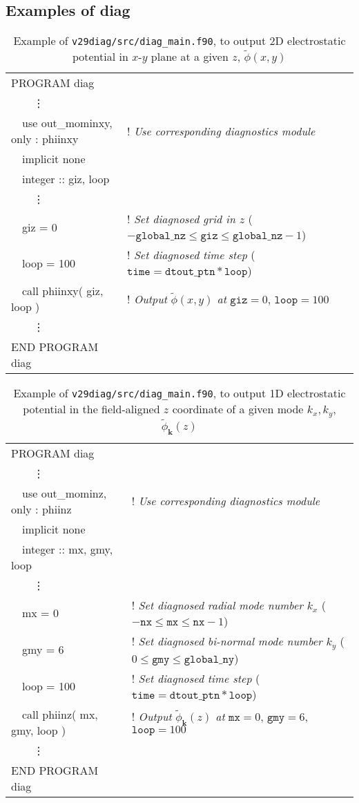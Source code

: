 \subsection{Examples of diag}
\begin{table}[h!]
  \caption{Example of \texttt{v29diag/src/diag\_main.f90}, to output 2D electrostatic potential in $x$-$y$ plane at a given $z$, $\tilde{\phi}(x,y)$}
  \centering
  \begin{tabular}{| l l |}
  \hline
  PROGRAM diag&\\
  ~~~~\vdots&\\
  ~~use out\_mominxy, only : phiinxy  & ! \textit{Use corresponding diagnostics module}\\
  ~~implicit none&\\
  ~~integer :: giz, loop&\\
  ~~~~\vdots&\\
  ~~giz = 0 & ! \textit{Set diagnosed grid in $z$} ($-\texttt{global\_nz} \leq \texttt{giz} \leq \texttt{global\_nz}-1$)\\
  ~~loop = 100 & ! \textit{Set diagnosed time step} ($\texttt{time} = \texttt{dtout\_ptn} * \texttt{loop}$)\\
  ~~call phiinxy( giz, loop ) & ! \textit{Output} $\tilde{\phi}(x,y)$ \textit{at} $\texttt{giz}=0$, $\texttt{loop}=100$\\
  ~~~~\vdots&\\
  END PROGRAM diag&\\
  \hline
  \end{tabular}
\end{table}
\begin{table}[h!]
  \caption{Example of \texttt{v29diag/src/diag\_main.f90}, to output 1D electrostatic potential in the field-aligned $z$ coordinate of a given mode $k_x, k_y$, $\tilde{\phi}_{\bm{k}}(z)$}
  \centering
  \begin{tabular}{| l l |}
  \hline
  PROGRAM diag&\\
  ~~~~\vdots&\\
  ~~use out\_mominz, only : phiinz  & ! \textit{Use corresponding diagnostics module}\\
  ~~implicit none&\\
  ~~integer :: mx, gmy, loop&\\
  ~~~~\vdots&\\
  ~~mx = 0 & ! \textit{Set diagnosed radial mode number $k_x$} ($-\texttt{nx} \leq \texttt{mx} \leq \texttt{nx}-1$)\\
  ~~gmy = 6 & ! \textit{Set diagnosed bi-normal mode number $k_y$} ($0 \leq \texttt{gmy} \leq \texttt{global\_ny}$)\\
  ~~loop = 100 & ! \textit{Set diagnosed time step} ($\texttt{time} = \texttt{dtout\_ptn} * \texttt{loop}$)\\
  ~~call phiinz( mx, gmy, loop ) & ! \textit{Output} $\tilde{\phi}_{\bm{k}}(z)$ \textit{at} $\texttt{mx}=0$, $\texttt{gmy}=6$, $\texttt{loop}=100$\\
  ~~~~\vdots&\\
  END PROGRAM diag&\\
  \hline
  \end{tabular}
\end{table}

